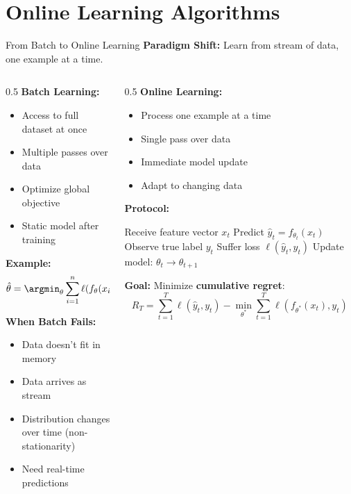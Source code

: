 
\section{Online Learning Algorithms}

\begin{frame}{From Batch to Online Learning}
\textbf{Paradigm Shift:} Learn from stream of data, one example at a time.

\begin{columns}
\begin{column}{0.5\textwidth}
\textbf{Batch Learning:}
\begin{itemize}
\item Access to full dataset at once
\item Multiple passes over data
\item Optimize global objective
\item Static model after training
\end{itemize}

\textbf{Example:}
\[\hat{\theta} = \argmin_\theta \sum_{i=1}^n \ell(f_\theta(x_i), y_i)\]

\vspace{0.3cm}
\textbf{When Batch Fails:}
\begin{itemize}
\item Data doesn't fit in memory
\item Data arrives as stream
\item Distribution changes over time (non-stationarity)
\item Need real-time predictions
\end{itemize}
\end{column}
\begin{column}{0.5\textwidth}
\textbf{Online Learning:}
\begin{itemize}
\item Process one example at a time
\item Single pass over data
\item Immediate model update
\item Adapt to changing data
\end{itemize}

\textbf{Protocol:}
\begin{algorithm}[H]
\caption{Online Learning Protocol}
\begin{algorithmic}[1]
\STATE Receive feature vector $x_t$
\STATE Predict $\hat{y}_t = f_{\theta_t}(x_t)$
\STATE Observe true label $y_t$
\STATE Suffer loss $\ell(\hat{y}_t, y_t)$
\STATE Update model: $\theta_t \to \theta_{t+1}$
\ENDFOR
\end{algorithmic}
\end{algorithm}

\textbf{Goal:} Minimize \textbf{cumulative regret}:
\[R_T = \sum_{t=1}^T \ell(\hat{y}_t, y_t) - \min_{\theta^*} \sum_{t=1}^T \ell(f_{\theta^*}(x_t), y_t)\]
\end{column}
\end{columns}
\end{frame}

